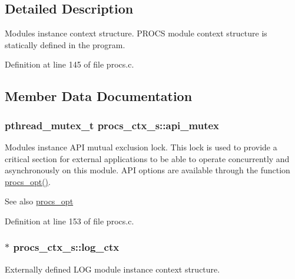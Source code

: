 \subsection{Detailed Description}
Module\textquotesingle{}s instance context structure. P\+R\+O\+CS module context structure is statically defined in the program. 

Definition at line 145 of file procs.\+c.



\subsection{Member Data Documentation}
\subsubsection[{\texorpdfstring{api\+\_\+mutex}{api_mutex}}]{\setlength{\rightskip}{0pt plus 5cm}pthread\+\_\+mutex\+\_\+t procs\+\_\+ctx\+\_\+s\+::api\+\_\+mutex}\hypertarget{structprocs__ctx__s_a27330c986436226abfa1b5a00b7bdeb1}{}\label{structprocs__ctx__s_a27330c986436226abfa1b5a00b7bdeb1}
Module\textquotesingle{}s instance A\+PI mutual exclusion lock. This lock is used to provide a critical section for external applications to be able to operate concurrently and asynchronously on this module. A\+PI options are available through the function \hyperlink{procs_8c_a7af2e6f2788006cfc96ca8d811922ffa}{procs\+\_\+opt()}. \begin{DoxySeeAlso}{See also}
\hyperlink{procs_8h_a7af2e6f2788006cfc96ca8d811922ffa}{procs\+\_\+opt} 
\end{DoxySeeAlso}


Definition at line 153 of file procs.\+c.

\subsubsection[{\texorpdfstring{log\+\_\+ctx}{log_ctx}}]{$\ast$ procs\+\_\+ctx\+\_\+s\+::log\+\_\+ctx}\hypertarget{structprocs__ctx__s_ab5d529e82924052baf26478afca901fa}{}\label{structprocs__ctx__s_ab5d529e82924052baf26478afca901fa}
Externally defined L\+OG module instance context structure. 

